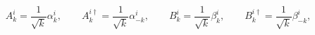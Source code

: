 \begin{equation}
A_{k}^{i}=\frac{1}{\sqrt{k}}\alpha _{k}^{i},\qquad A_{k}^{i\dagger }=
\frac{1}{\sqrt{k}}\alpha _{-k}^{i},
\qquad B_{k}^{i} =\frac{1}{\sqrt{k}}\beta _{k}^{i},\qquad B_{k}^{i\dagger }=
\frac{1}{\sqrt{k}}\beta _{-k}^{i},
\end{equation}


